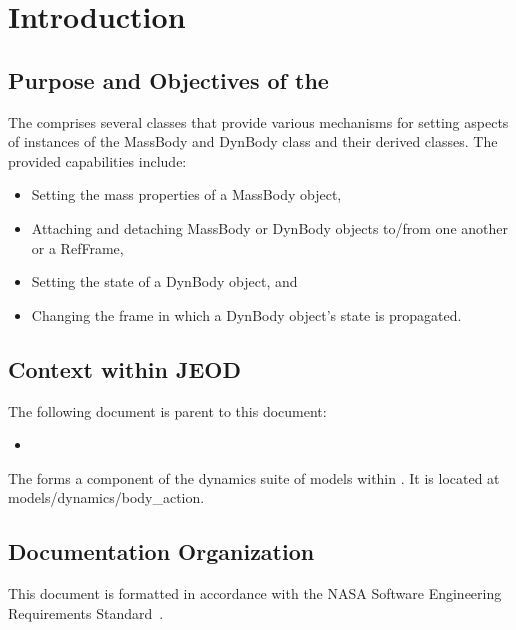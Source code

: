 %
\chapter{Introduction}
\label{ch:overview:intro}

\section{Purpose and Objectives of the \ModelDesc}
\label{sec:overview:purp}
The \ModelDesc comprises several classes that provide various mechanisms
for setting aspects of instances of the MassBody and DynBody class and
 their derived classes.
The provided capabilities include:
\begin{itemize}
\item Setting the mass properties of a MassBody object,
\item Attaching and detaching MassBody or DynBody objects to/from one another or a RefFrame,
\item Setting the state of a DynBody object, and
\item Changing the frame in which a DynBody object's state is propagated.
\end{itemize}

\section{Context within JEOD}
The following document is parent to this document:
\begin{itemize}
\item \hyperJEOD
\end{itemize}

The \ModelDesc forms a component of the dynamics suite of
models within \JEODid. It is located at
models/dynamics/body\_action.





\section{Documentation Organization}
\label{sec:overview:docorg}
This document is formatted in accordance with the
NASA Software Engineering Requirements Standard~\cite{NASA:SWE}.

